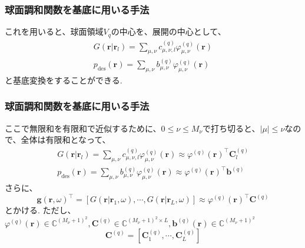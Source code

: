 \documentclass[uplatex,dvipdfmx,11pt,notheorems]{beamer}
\theoremstyle{definition}
\begin{document}
  \begin{frame}\frametitle{球面調和関数を基底に用いる手法}
 これを用いると、球面領域$V_{q}$の中心を、展開の中心として、
 $$\begin{array}{l}{G\left(\boldsymbol{r} | \boldsymbol{r}_{l}\right)=\sum_{\mu,\nu} c_{\mu, \nu,l}^{(q)} \varphi_{\mu,\nu}^{(q)}(\boldsymbol{r})} \\ {p_{\mathrm{des}}(\boldsymbol{r})=\sum_{\mu,\nu} b_{\mu,\nu}^{(q)} \varphi_{\mu,\nu}^{(q)}(\boldsymbol{r})}\end{array}$$
と基底変換をすることができる.
 \end{frame}

  \begin{frame}\frametitle{球面調和関数を基底に用いる手法}
ここで無限和を有限和で近似するために、$0 \leq \nu \leq M_{\nu}$で打ち切ると、$|\mu|\leq\nu$なので、全体は有限和となって、
$$\begin{array}{l}{G\left(\boldsymbol{r} | \boldsymbol{r}_{l}\right)=\sum_{\mu,\nu} c_{\mu, \nu,l}^{(q)} \varphi_{\mu,\nu}^{(q)}(\boldsymbol{r})} \approx \varphi^{(q)}(\boldsymbol{r})^{\top} \boldsymbol{C}_{l}^{(q)}\\ {p_{\mathrm{des}}(\boldsymbol{r})=\sum_{\mu,\nu} b_{\mu,\nu}^{(q)} \varphi_{\mu,\nu}^{(q)}(\boldsymbol{r})} \approx \varphi^{(q)}(\boldsymbol{r})^{\top} \boldsymbol{b}^{(q)}\end{array}$$
さらに、
$$\boldsymbol{g}(\boldsymbol{r}, \omega)^{\top}=\left[G\left(\boldsymbol{r} | \boldsymbol{r}_{1}, \omega\right), \cdots, G\left(\boldsymbol{r} | \boldsymbol{r}_{L}, \omega\right)\right] \approx \varphi^{(q)}(\boldsymbol{r})^{\top} \boldsymbol{C}^{(q)}$$
とかける.
ただし、$\varphi^{(q)}(\boldsymbol{r}) \in \mathbb{C}^{(M_{\nu}+1)^{2}}, \boldsymbol{C}^{(q)} \in \mathbb{C}^{\left(M_{\nu}+1\right)^{2} \times L}, \boldsymbol{b}^{(q)}(\boldsymbol{r}) \in \mathbb{C}^{(M_{\nu}+1)^{2}}$
$$\boldsymbol{C}^{(q)}  = \left[\boldsymbol{C}_{1}^{(q)}, \cdots,\boldsymbol{C}_{L}^{(q)} \right]$$

 \end{frame}

 
\end{document}
